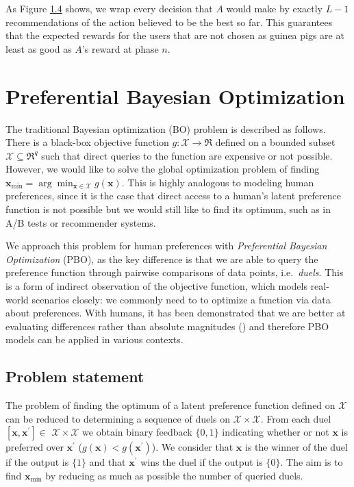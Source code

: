 \documentclass[
  letterpaper,
  numbers=noenddot,
  DIV=11,
  oneside]{scrreprt}
\theoremstyle{remark}
\begin{document}
As Figure \hyperref[fig-multi-armed-guinea-pig]{1.4} shows, we wrap
every decision that \(A\) would make by exactly \(L-1\) recommendations
of the action believed to be the best so far. This guarantees that the
expected rewards for the users that are not chosen as guinea pigs are at
least as good as \(A\)'s reward at phase \(n\).

\section{Preferential Bayesian
Optimization}\label{preferential-bayesian-optimization}

The traditional Bayesian optimization (BO) problem is described as
follows. There is a black-box objective function
\(g: \mathcal{X} \rightarrow \Re\) defined on a bounded subset
\(\mathcal{X} \subseteq \Re^q\) such that direct queries to the function
are expensive or not possible. However, we would like to solve the
global optimization problem of finding
\(\mathbf{x}_{\min }=\arg \min _{\mathbf{x} \in \mathcal{X}} g(\mathbf{x})\).
This is highly analogous to modeling human preferences, since it is the
case that direct access to a human's latent preference function is not
possible but we would still like to find its optimum, such as in A/B
tests or recommender systems.

We approach this problem for human preferences with \emph{Preferential
Bayesian Optimization} (PBO), as the key difference is that we are able
to query the preference function through pairwise comparisons of data
points, i.e.~\emph{duels}. This is a form of indirect observation of the
objective function, which models real-world scenarios closely: we
commonly need to to optimize a function via data about preferences. With
humans, it has been demonstrated that we are better at evaluating
differences rather than absolute magnitudes
() and
therefore PBO models can be applied in various contexts.

\subsection{Problem statement}\label{problem-statement}

The problem of finding the optimum of a latent preference function
defined on \(\mathcal{X}\) can be reduced to determining a sequence of
duels on \(\mathcal{X} \times \mathcal{X}\). From each duel
\(\left[\mathbf{x}, \mathbf{x}^{\prime}\right] \in\)
\(\mathcal{X} \times \mathcal{X}\) we obtain binary feedback \(\{0,1\}\)
indicating whether or not \(\mathbf{x}\) is preferred over
\(\mathbf{x}^{\prime}\) (\(g(\mathbf{x}) < g(\mathbf{x}^{\prime})\)). We
consider that \(\mathbf{x}\) is the winner of the duel if the output is
\(\{1\}\) and that \(\mathbf{x}^{\prime}\) wins the duel if the output
is \(\{0\}\). The aim is to find \(\mathbf{x}_{\min }\) by reducing as
much as possible the number of queried duels.
\end{document}
